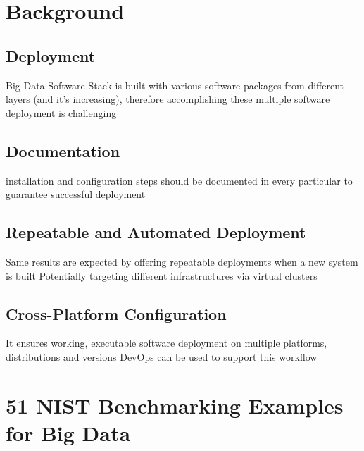 

\section{Background}

\subsection{Deployment}

Big Data Software Stack is built with various software packages from different layers (and it’s increasing), therefore accomplishing these multiple software deployment is challenging
\subsection{Documentation}
installation and configuration steps should be documented in every particular to guarantee successful deployment
\subsection{Repeatable and Automated Deployment}
Same results are expected by offering repeatable deployments when a new system is built
Potentially targeting different infrastructures via virtual clusters
\subsection{Cross-Platform Configuration}
It ensures working, executable software deployment on multiple platforms, distributions and versions
DevOps can be used to support this workflow


\section{51 NIST Benchmarking Examples for Big Data}

